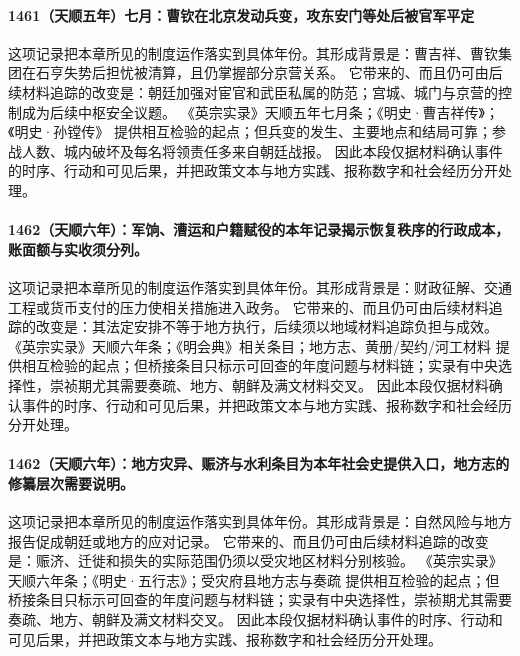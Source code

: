 \paragraph{1461（天顺五年）七月：曹钦在北京发动兵变，攻东安门等处后被官军平定} 这项记录把本章所见的制度运作落实到具体年份。其形成背景是：曹吉祥、曹钦集团在石亨失势后担忧被清算，且仍掌握部分京营关系。 它带来的、而且仍可由后续材料追踪的改变是：朝廷加强对宦官和武臣私属的防范；宫城、城门与京营的控制成为后续中枢安全议题。 《英宗实录》天顺五年七月条；《明史·曹吉祥传》；《明史·孙镗传》 提供相互检验的起点；但兵变的发生、主要地点和结局可靠；参战人数、城内破坏及每名将领责任多来自朝廷战报。 因此本段仅据材料确认事件的时序、行动和可见后果，并把政策文本与地方实践、报称数字和社会经历分开处理。

\paragraph{1462（天顺六年）：军饷、漕运和户籍赋役的本年记录揭示恢复秩序的行政成本，账面额与实收须分列。} 这项记录把本章所见的制度运作落实到具体年份。其形成背景是：财政征解、交通工程或货币支付的压力使相关措施进入政务。 它带来的、而且仍可由后续材料追踪的改变是：其法定安排不等于地方执行，后续须以地域材料追踪负担与成效。 《英宗实录》天顺六年条；《明会典》相关条目；地方志、黄册/契约/河工材料 提供相互检验的起点；但桥接条目只标示可回查的年度问题与材料链；实录有中央选择性，崇祯期尤其需要奏疏、地方、朝鲜及满文材料交叉。 因此本段仅据材料确认事件的时序、行动和可见后果，并把政策文本与地方实践、报称数字和社会经历分开处理。

\paragraph{1462（天顺六年）：地方灾异、赈济与水利条目为本年社会史提供入口，地方志的修纂层次需要说明。} 这项记录把本章所见的制度运作落实到具体年份。其形成背景是：自然风险与地方报告促成朝廷或地方的应对记录。 它带来的、而且仍可由后续材料追踪的改变是：赈济、迁徙和损失的实际范围仍须以受灾地区材料分别核验。 《英宗实录》天顺六年条；《明史·五行志》；受灾府县地方志与奏疏 提供相互检验的起点；但桥接条目只标示可回查的年度问题与材料链；实录有中央选择性，崇祯期尤其需要奏疏、地方、朝鲜及满文材料交叉。 因此本段仅据材料确认事件的时序、行动和可见后果，并把政策文本与地方实践、报称数字和社会经历分开处理。

